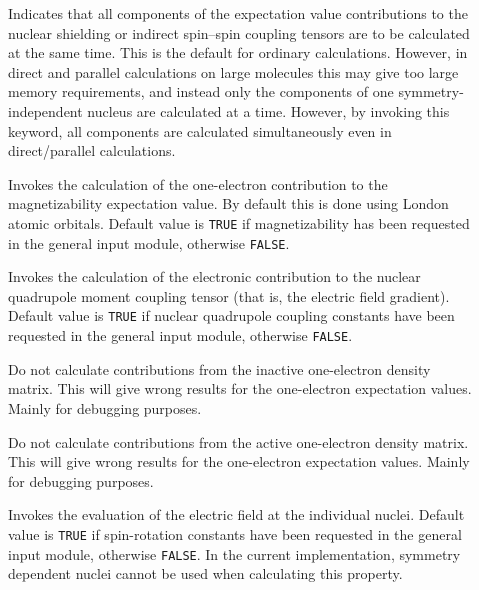 \begin{description}
\item[] Indicates that all components of the expectation
  value contributions to the nuclear
shielding or indirect spin--spin
  coupling
  tensors are to be calculated at the
same time. This is the 
default for ordinary calculations. However, in direct and parallel
calculations on large molecules this may give too large memory
requirements, and instead only the components of one symmetry-independent
nucleus are calculated at a time. However, by invoking
this keyword, all components are calculated simultaneously even in
direct/parallel calculations.

\item[] Invokes the calculation of the one-electron
contribution to the magnetizability expectation
value. By default this 
is done using London atomic orbitals. Default
value is \verb|TRUE| if 
magnetizability has been requested in the general input module,
otherwise \verb|FALSE|.

\item[] Invokes the calculation of the electronic
contribution to the nuclear quadrupole moment coupling
tensor (that
is, the electric field 
gradient). Default value is \verb|TRUE| if 
nuclear quadrupole coupling constants have been requested in the
general input module, otherwise \verb|FALSE|.

\item[] Do not calculate contributions from the inactive
one-electron density matrix. This will give wrong results for the
one-electron expectation values. Mainly for debugging purposes.

\item[] Do not calculate contributions from the active
one-electron density matrix. This will give wrong results for the
one-electron expectation values. Mainly for debugging purposes.

\item[] Invokes the evaluation of the electric
field at the individual nuclei. Default
value is \verb|TRUE| if 
spin-rotation constants have been
requested in the general input 
module, otherwise \verb|FALSE|. In the current implementation,
symmetry dependent nuclei cannot be used when calculating this property.


\end{description}

